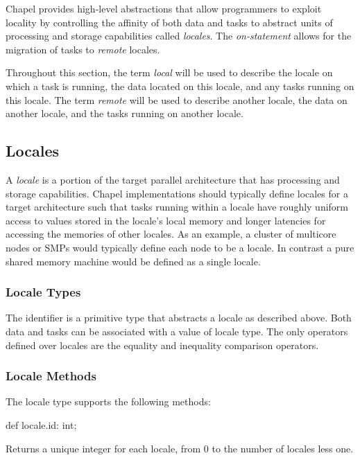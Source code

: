 \label{Locales}

Chapel provides high-level abstractions that allow programmers to
exploit locality by controlling the affinity of both data and tasks to
abstract units of processing and storage capabilities
called \emph{locales}.  The \emph{on-statement} allows for the
migration of tasks to \emph{remote} locales.

Throughout this section, the term \emph{local} will be used to
describe the locale on which a task is running, the data located on
this locale, and any tasks running on this locale.  The
term \emph{remote} will be used to describe another locale, the data
on another locale, and the tasks running on another locale.

\subsection{Locales}

A \emph{locale} is a portion of the target parallel architecture that
has processing and storage capabilities.  Chapel implementations
should typically define locales for a target architecture such that
tasks running within a locale have roughly uniform access to values
stored in the locale's local memory and longer latencies for accessing
the memories of other locales.  As an example, a cluster of multicore
nodes or SMPs would typically define each node to be a locale.  In
contrast a pure shared memory machine would be defined as a single
locale.

\subsubsection{Locale Types}
\label{The_Locale_Type}

The identifier  is a primitive type that abstracts a
locale as described above.  Both data and tasks can be associated with
a value of locale type. The only operators defined over locales are
the equality and inequality comparison operators.

\subsubsection{Locale Methods}
\label{Locale_Methods}

The locale type supports the following methods:

\begin{protohead}
def locale.id: int;
\end{protohead}
\begin{protobody}
Returns a unique integer for each locale, from 0 to the number of
locales less one.
\end{protobody}

